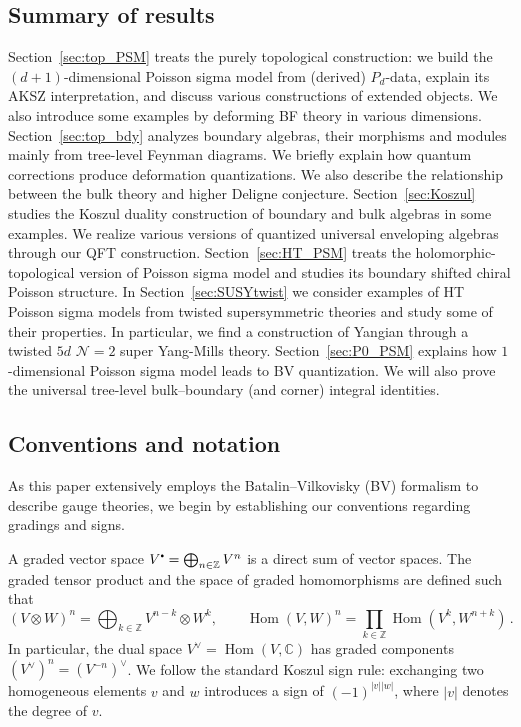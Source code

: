 \documentclass[11pt]{article}
\newcommand{\C}{\mathbb{C}}
\newcommand{\Z}{\mathbb{Z}}
\newcommand\sbullet[1][.5]{\mathbin{\vcenter{\hbox{\scalebox{#1}{$\bullet$}}}}}
\DeclareMathOperator{\Hom}{Hom}
\numberwithin{equation}{section}
\begin{document}
	\subsection{Summary of results}
	Section~\ref{sec:top_PSM} treats the purely topological construction: we build the $(d+1)$-dimensional Poisson sigma model from (derived) $P_d$-data, explain its AKSZ interpretation, and discuss various constructions of extended objects. We also introduce some examples by deforming BF theory in various dimensions. Section~\ref{sec:top_bdy} analyzes boundary algebras, their morphisms and modules mainly from tree-level Feynman diagrams. We  briefly explain how quantum corrections produce deformation quantizations. We also describe the relationship between the bulk theory and higher Deligne conjecture. Section~\ref{sec:Koszul} studies the Koszul duality construction of boundary and bulk algebras in some examples. We realize various versions of quantized universal enveloping algebras through our QFT construction. Section~\ref{sec:HT_PSM} treats the holomorphic-topological version of Poisson sigma model and studies its boundary shifted chiral Poisson structure. In Section~\ref{sec:SUSYtwist} we consider examples of HT Poisson sigma models from twisted supersymmetric theories and study some of their properties. In particular, we find a construction of Yangian through a twisted $5d$ $\mathcal{N} = 2$ super Yang-Mills theory. Section~\ref{sec:P0_PSM} explains how $1$-dimensional Poisson sigma model leads to BV quantization. We will also prove the universal tree-level bulk--boundary (and corner) integral identities. 
	
	
	\subsection{Conventions and notation}
	As this paper extensively employs the Batalin--Vilkovisky (BV) formalism to describe gauge theories, we begin by establishing our conventions regarding gradings and signs.
	
	A graded vector space $V^{\sbullet} = \bigoplus_{n \in \Z}V^n$ is a direct sum of vector spaces. The graded tensor product and the space of graded homomorphisms are defined such that
	\begin{equation}
		(V\otimes W)^{n} = \bigoplus_{k \in \Z}V^{n-k}\otimes W^{k},\qquad \Hom(V,W)^n = \prod_{k \in \Z}\Hom(V^{k},W^{n+k})\,.
	\end{equation}
	In particular, the dual space $V^{\vee} = \Hom(V,\C)$ has graded components $(V^{\vee})^n  = (V^{-n})^{\vee}$. We follow the standard Koszul sign rule: exchanging two homogeneous elements $v$ and $w$ introduces a sign of $(-1)^{|v||w|}$, where $|v|$ denotes the degree of $v$.
	 
\end{document}
